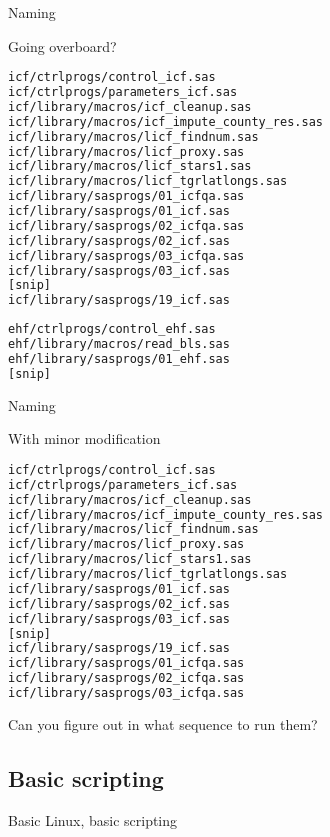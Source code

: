 \documentclass[xcolor=table,compress]{beamer}
\begin{document}
\begin{frame}[fragile]{Naming}
\begin{block}{Going overboard?}
\begin{lstlisting}[language=bash,numbers=none,basicstyle=\tiny]
icf/ctrlprogs/control_icf.sas
icf/ctrlprogs/parameters_icf.sas
icf/library/macros/icf_cleanup.sas
icf/library/macros/icf_impute_county_res.sas
icf/library/macros/licf_findnum.sas
icf/library/macros/licf_proxy.sas
icf/library/macros/licf_stars1.sas
icf/library/macros/licf_tgrlatlongs.sas
icf/library/sasprogs/01_icfqa.sas
icf/library/sasprogs/01_icf.sas
icf/library/sasprogs/02_icfqa.sas
icf/library/sasprogs/02_icf.sas
icf/library/sasprogs/03_icfqa.sas
icf/library/sasprogs/03_icf.sas
[snip]
icf/library/sasprogs/19_icf.sas
\end{lstlisting}
\pause
\begin{lstlisting}[language=bash,numbers=none,basicstyle=\tiny]
ehf/ctrlprogs/control_ehf.sas
ehf/library/macros/read_bls.sas
ehf/library/sasprogs/01_ehf.sas
[snip]
\end{lstlisting}
\end{block}
\end{frame}


\begin{frame}[fragile]{Naming}
\begin{block}{With minor modification}
\begin{lstlisting}[language=bash,numbers=none,basicstyle=\tiny]
icf/ctrlprogs/control_icf.sas
icf/ctrlprogs/parameters_icf.sas
icf/library/macros/icf_cleanup.sas
icf/library/macros/icf_impute_county_res.sas
icf/library/macros/licf_findnum.sas
icf/library/macros/licf_proxy.sas
icf/library/macros/licf_stars1.sas
icf/library/macros/licf_tgrlatlongs.sas
icf/library/sasprogs/01_icf.sas
icf/library/sasprogs/02_icf.sas
icf/library/sasprogs/03_icf.sas
[snip]
icf/library/sasprogs/19_icf.sas
icf/library/sasprogs/01_icfqa.sas
icf/library/sasprogs/02_icfqa.sas
icf/library/sasprogs/03_icfqa.sas
\end{lstlisting}
Can you figure out in what sequence to run them?
\end{block}
\end{frame}






\subsection{Basic scripting}

\begin{frame}
Basic Linux, basic scripting
\end{frame}
\end{document}
